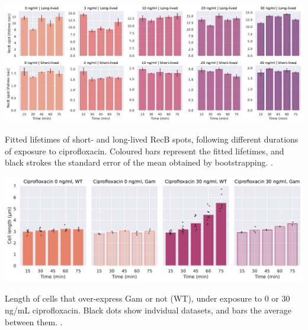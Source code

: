 \begin{suppfigure*}[htbp]
    \begin{center}
    \includegraphics[width=\linewidth]{SI_Figures/RecB_lifetime_timepoints.pdf}
    \end{center}
    \caption{Fitted lifetimes of short- and long-lived RecB spots, following different durations of exposure to ciprofloxacin. Coloured bars represent the fitted lifetimes, and black strokes the standard error of the mean obtained by bootstrapping. . }
    \label{SIFig:RecB_lifetimes_timepoints}
    \end{suppfigure*}

\begin{suppfigure*}[htbp]
    \begin{center}
    \includegraphics[width=\linewidth]{SI_Figures/Cell_length_Gam.pdf}
    \end{center}
    \caption{Length of cells that over-express Gam or not (WT), under exposure to 0 or 30 ng/mL ciprofloxacin. Black dots show indvidual datasets, and bars the average between them. .}
    \label{SIFig:Gam_cell_length}
\end{suppfigure*}

